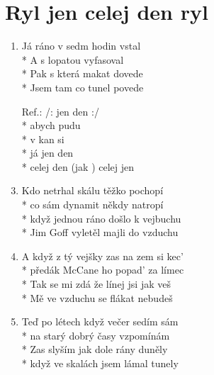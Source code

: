 \section{Ryl jen celej den ryl}
\begin{enumerate}
\item Já  ráno v sedm hodin vstal \\*
A  s lopatou vyfasoval \\*
Pak s  která makat dovede \\*
Jsem  tam co tunel povede 
\item[Ref.:]  /:  jen  den  :/ \\*
abych      pudu  \\*
 v kan  si  \\*
já  jen  den  \\*
celej den  (jak ) celej  jen  
\item Kdo netrhal skálu těžko pochopí \\*
co sám dynamit někdy natropí \\*
když jednou ráno došlo k vejbuchu \\*
Jim Goff vyletěl majli do vzduchu 
\item A když z tý vejšky zas na zem si kec' \\*
předák McCane ho popad' za límec \\*
Tak se mi zdá že línej jsi jak veš \\*
Mě ve vzduchu se flákat nebudeš 
\item Teď po létech když večer sedím sám \\*
na starý dobrý časy vzpomínám \\*
Zas slyším jak dole rány duněly \\*
když ve skalách jsem lámal tunely
\end{enumerate}
